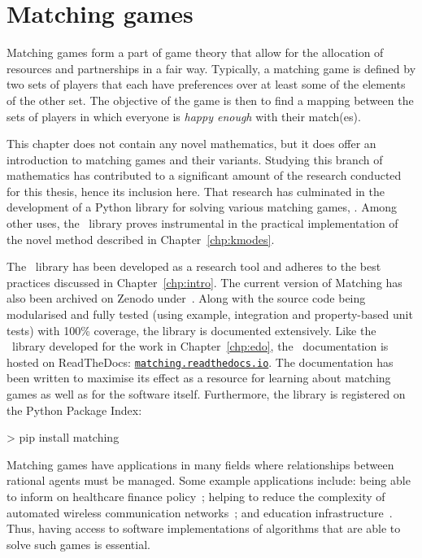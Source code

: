 \chapter{Matching games}
\label{chp:matching}

\graphicspath{{chapters/matching/paper/img/}}

Matching games form a part of game theory that allow for the allocation of
resources and partnerships in a fair way. Typically, a matching game is defined
by two sets of players that each have preferences over at least some of the
elements of the other set. The objective of the game is then to find a mapping
between the sets of players in which everyone is \emph{happy enough} with their
match(es).

This chapter does not contain any novel mathematics, but it does offer an
introduction to matching games and their variants. Studying this branch of
mathematics has contributed to a significant amount of the research conducted
for this thesis, hence its inclusion here. That research has culminated in the
development of a Python library for solving various matching games, \matching.
Among other uses, the \matching\ library proves instrumental in the practical
implementation of the novel method described in Chapter~\ref{chp:kmodes}.

The \matching\ library has been developed as a research tool and adheres to the
best practices discussed in Chapter~\ref{chp:intro}. The current version of
Matching has also been archived on Zenodo under~.
Along with the source code being modularised and fully tested (using example,
integration and property-based unit tests) with 100\% coverage, the library is
documented extensively. Like the \edo\ library developed for the work in
Chapter~\ref{chp:edo}, the \matching\ documentation is hosted on ReadTheDocs:
\href{https://matching.readthedocs.io}{\nolinkurl{matching.readthedocs.io}}.
The documentation has been written to maximise its effect as a resource for
learning about matching games as well as for the software itself. Furthermore,
the library is registered on the Python Package Index:

\begin{usagesh}
> pip install matching
\end{usagesh}

Matching games have applications in many fields where relationships between
rational agents must be managed. Some example applications include: being able
to inform on healthcare finance policy~\cite{Agarwal2017}; helping to reduce the
complexity of automated wireless communication networks~\cite{Bayat2016}; and
education infrastructure~\cite{Chiarandini2019}. Thus, having access to software
implementations of algorithms that are able to solve such games is essential.

